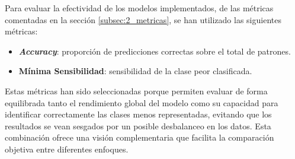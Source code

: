 Para evaluar la efectividad de los modelos implementados, de las métricas comentadas en la sección \ref{subsec:2_metricas}, se han utilizado las siguientes métricas:

\begin{itemize}
	\item \textbf{\textit{Accuracy}}: proporción de predicciones correctas sobre el total de patrones.
	\item \textbf{Mínima Sensibilidad}: sensibilidad de la clase peor clasificada.
\end{itemize}

Estas métricas han sido seleccionadas porque permiten evaluar de forma equilibrada tanto el rendimiento global del modelo como su capacidad para identificar correctamente las clases menos representadas, evitando que los resultados se vean sesgados por un posible desbalanceo en los datos. Esta combinación ofrece una visión complementaria que facilita la comparación objetiva entre diferentes enfoques.